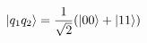 \documentclass[preview]{standalone}
\begin{document}
\begin{align*}
\ket{q_1 q_2}=\frac{1}{\sqrt{2}} (\ket{00} + \ket{11})
\end{align*}
\end{document}

